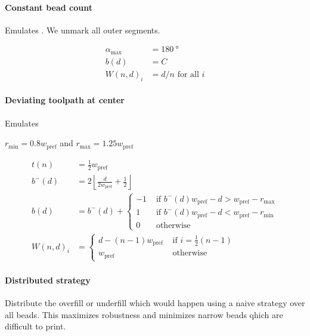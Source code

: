 \paragraph{Constant bead count}
Emulates \cite{Ding2016a}. We unmark all outer segments.

\begin{align*}
\alpha_\text{max} &= \SI{180}{\degree} \\
b(d) &= C \\
W(n,d)_i &= d / n \text{ for all } i 
\end{align*}

\paragraph{Deviating toolpath at center}
Emulates \cite{Jin2017}

$r_\text{min} = 0.8 w_\text{pref}$ and $r_\text{max} = 1.25 w_\text{pref}$

\begin{align*}
t(n) &= \frac12 w_\text{pref} \\
b^-(d) &= 2 \left\lfloor \frac{d}{ 2w_\text{pref}} + \frac12 \right\rfloor \\
b(d) &= b^-(d) +
\begin{cases}
-1 & \text{ if } b^-(d) w_\text{pref} - d > w_\text{pref} - r_\text{max} \\
1  & \text{ if }  b^-(d) w_\text{pref} - d < w_\text{pref} - r_\text{min} \\
0 & \text{ otherwise}
\end{cases}
\\
W(n,d)_i &= 
\begin{cases}
d - (n-1) w_\text{pref} &\text{ if } i = \frac12 (n-1) \\
w_\text{pref} &\text{ otherwise }
\end{cases}
\end{align*}





\paragraph{Distributed strategy}
Distribute the overfill or underfill which would happen using a naive strategy over all beads.
This maximizes robustness and minimizes narrow beads qhich are difficult to print.


